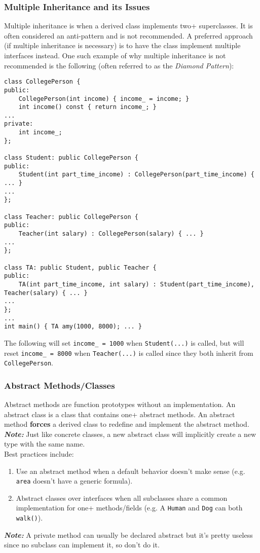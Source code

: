 \documentclass{article}
\begin{document}
\subsubsection{Multiple Inheritance and its Issues}
Multiple inheritance is when a derived class implements two+
superclasses. It is often considered an anti-pattern and is not
recommended. A preferred approach (if multiple inheritance is
necessary) is to have the class implement multiple interfaces
instead. One such example of why multiple inheritance is not
recommended is the following (often referred to as the \textit{Diamond
  Pattern}):
\begin{verbatim}
class CollegePerson {
public:
    CollegePerson(int income) { income_ = income; }
    int income() const { return income_; }
...
private:
    int income_;
};

class Student: public CollegePerson {
public:
    Student(int part_time_income) : CollegePerson(part_time_income) { ... }
...
};

class Teacher: public CollegePerson {
public:
    Teacher(int salary) : CollegePerson(salary) { ... }
...
};

class TA: public Student, public Teacher {
public:
    TA(int part_time_income, int salary) : Student(part_time_income), Teacher(salary) { ... } 
...
};
...
int main() { TA amy(1000, 8000); ... }
\end{verbatim}
The following will set \texttt{income\_ = 1000} when
\texttt{Student(...)} is called, but will reset \texttt{income\_ =
  8000} when \texttt{Teacher(...)} is called since they both inherit
from \texttt{CollegePerson}.

\subsubsection{Abstract Methods/Classes}
Abstract methods are function prototypes without an implementation. An
abstract class is a class that contains one+ abstract methods. An
abstract method \textbf{forces} a derived class to redefine and
implement the abstract method. \\
\textit{\textbf{Note:}} Just like concrete classes, a new abstract
class will implicitly create a new type with the same name. \\
Best practices include:
\begin{enumerate}[label=(\roman*)]
\item Use an abstract method when a default behavior doesn't make
  sense (e.g. \texttt{area} doesn't have a generic formula).
\item Abstract classes over interfaces when all subclasses share a
  common implementation for one+ methods/fields (e.g. A \texttt{Human}
  and \texttt{Dog} can both \texttt{walk()}).
\end{enumerate}
\textit{\textbf{Note:}} A private method can usually be declared abstract but
it's pretty useless since no subclass can implement it, so don't do
it.
\end{document}
